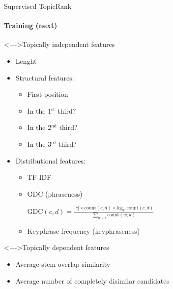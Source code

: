   \begin{frame}{Supervised TopicRank}
    \framesubtitle{Training (next)}

    \begin{block}<+->{Topically independent features}
      \begin{multicols}{2}
        \begin{itemize}
          \item{Lenght}
          \item<+->{Structural features:}
          \begin{itemize}
            \item{First position}
            \item{In the 1$^{\text{st}}$ third?}
            \item{In the 2$^{\text{nd}}$ third?}
            \item{In the 3$^{\text{rd}}$ third?}
          \end{itemize}
          \item<+->{Distributional features:}
          \begin{itemize}
            \item{TF-IDF}
            \item{GDC (phraseness)\\}
            \begin{tiny}
              \hspace{-1em}$\text{GDC}(c, d) = \frac{|c| \times \text{count}(c, d) \times \text{log}_{10}\text{count}(c, d)}{\sum_{w \in c}\text{count}(w, d)}$
            \end{tiny}
            \item{Keyphrase frequency (keyphraseness)}
          \end{itemize}
        \end{itemize}
      \end{multicols}
    \end{block}

    \begin{block}<+->{Topically dependent features}
      \begin{itemize}
        \item{Average stem overlap similarity}
        \item<+->{Average number of completely disimilar candidates}
      \end{itemize}
    \end{block}
  \end{frame}

